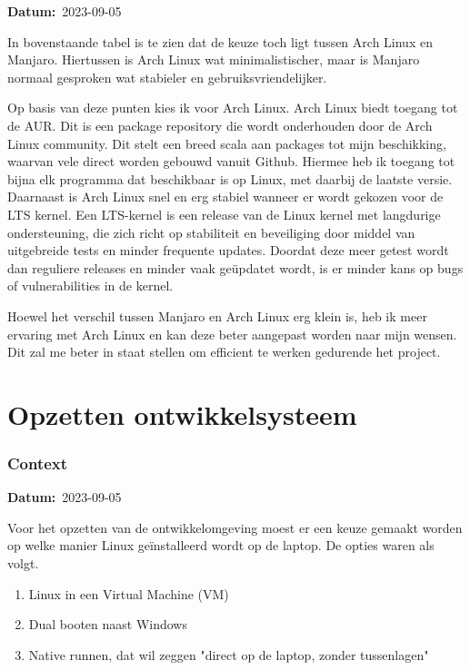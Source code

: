 \documentclass[a4paper]{report}
\newcommand{\personalbox}{
  \begin{tcolorbox}[hbox, colback=green!5!white,colframe=green!75!black,
    left=.1mm, right=.1mm, top=.1mm, bottom=.1mm, fontupper=\scriptsize\sffamily]
    Persoonlijke Keuze
  \end{tcolorbox}
}
\newcommand{\personalchoice}[1]{
  \section[ #1 ]{#1~\mbox{\raisebox{-2.5pt}{\personalbox}}}
}
\newcommand{\timestamp}[1]{
  \mbox{\scriptsize \textbf{Datum:} #1} \smallbreak
}
\begin{document}
\par\smallskip
\timestamp{2023-09-05}
In bovenstaande tabel is te zien dat de keuze toch ligt tussen Arch Linux en Manjaro.
Hiertussen is Arch Linux wat minimalistischer, maar is Manjaro normaal gesproken wat stabieler en gebruiksvriendelijker. 
\par\smallskip
Op basis van deze punten kies ik voor Arch Linux. 
Arch Linux biedt toegang tot de AUR. Dit is een package repository die wordt onderhouden door de Arch Linux community.
Dit stelt een breed scala aan packages tot mijn beschikking, waarvan vele direct worden gebouwd vanuit Github.
Hiermee heb ik toegang tot bijna elk programma dat beschikbaar is op Linux, met daarbij de laatste versie. 
Daarnaast is Arch Linux snel en erg stabiel wanneer er wordt gekozen voor de LTS kernel\cite{QuickTipsStableArch}.
Een LTS-kernel is een release van de Linux kernel met langdurige ondersteuning, die zich richt op stabiliteit en beveiliging door middel van uitgebreide tests en minder frequente updates.
Doordat deze meer getest wordt dan reguliere releases en minder vaak geüpdatet wordt, is er minder kans op bugs of vulnerabilities in de kernel\cite{enwiki:1177298994}.
\par\smallskip
Hoewel het verschil tussen Manjaro en Arch Linux erg klein is, heb ik meer ervaring met Arch Linux en kan deze beter aangepast worden naar mijn wensen. 
Dit zal me beter in staat stellen om efficient te werken gedurende het project.


\personalchoice{Opzetten ontwikkelsysteem}
\subsubsection{Context}
\timestamp{2023-09-05}
Voor het opzetten van de ontwikkelomgeving moest er een keuze gemaakt worden op welke manier Linux geïnstalleerd wordt op de laptop. 
De opties waren als volgt.
\begin{enumerate}
  \item Linux in een Virtual Machine (VM)
  \item Dual booten naast Windows
  \item Native runnen, dat wil zeggen "direct op de laptop, zonder tussenlagen"
\end{enumerate}
\end{document}
